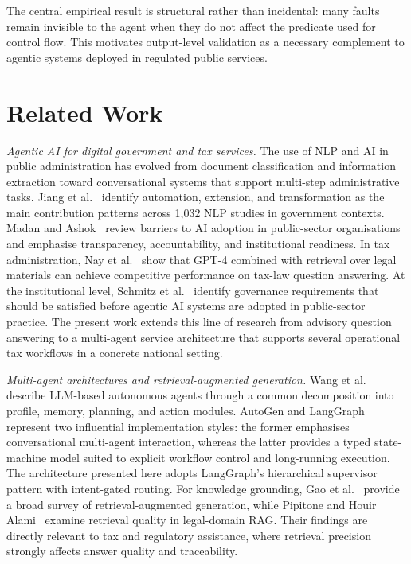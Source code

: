 \documentclass[3p,times,procedia]{elsarticle}
\begin{document}
The central empirical result is structural rather than incidental: many faults remain invisible to the agent when they do not affect the predicate used for control flow. This motivates output-level validation as a necessary complement to agentic systems deployed in regulated public services.


\section{Related Work}
\label{sec:related}

\textit{Agentic AI for digital government and tax services.}
The use of NLP and AI in public administration has evolved from document classification and information extraction toward conversational systems that support multi-step administrative tasks. Jiang et al.~\cite{Jiang2023} identify automation, extension, and transformation as the main contribution patterns across 1{,}032 NLP studies in government contexts. Madan and Ashok~\cite{Madan2022} review barriers to AI adoption in public-sector organisations and emphasise transparency, accountability, and institutional readiness. In tax administration, Nay et al.~\cite{Nay2024} show that GPT-4 combined with retrieval over legal materials can achieve competitive performance on tax-law question answering. At the institutional level, Schmitz et al.~\cite{Schmitz2025} identify governance requirements that should be satisfied before agentic AI systems are adopted in public-sector practice. The present work extends this line of research from advisory question answering to a multi-agent service architecture that supports several operational tax workflows in a concrete national setting.

\textit{Multi-agent architectures and retrieval-augmented generation.}
Wang et al.~\cite{Wang2024survey} describe LLM-based autonomous agents through a common decomposition into profile, memory, planning, and action modules. AutoGen \cite{AutoGen2023} and LangGraph \cite{LangGraph2025} represent two influential implementation styles: the former emphasises conversational multi-agent interaction, whereas the latter provides a typed state-machine model suited to explicit workflow control and long-running execution. The architecture presented here adopts LangGraph's hierarchical supervisor pattern with intent-gated routing. For knowledge grounding, Gao et al.~\cite{Gao2024} provide a broad survey of retrieval-augmented generation, while Pipitone and Houir Alami~\cite{Pipitone2024} examine retrieval quality in legal-domain RAG. Their findings are directly relevant to tax and regulatory assistance, where retrieval precision strongly affects answer quality and traceability.
\end{document}
